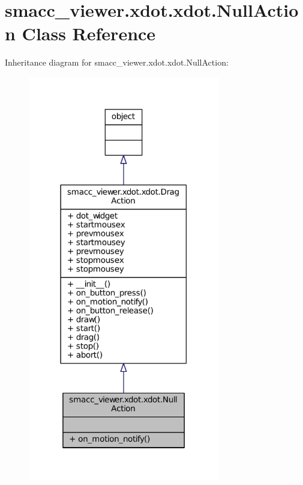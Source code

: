 \hypertarget{classsmacc__viewer_1_1xdot_1_1xdot_1_1NullAction}{}\section{smacc\+\_\+viewer.\+xdot.\+xdot.\+Null\+Action Class Reference}
\label{classsmacc__viewer_1_1xdot_1_1xdot_1_1NullAction}


Inheritance diagram for smacc\+\_\+viewer.\+xdot.\+xdot.\+Null\+Action\+:
\nopagebreak
\begin{figure}[H]
\begin{center}
\leavevmode
\includegraphics[width=237pt]{classsmacc__viewer_1_1xdot_1_1xdot_1_1NullAction__inherit__graph}
\end{center}
\end{figure}


